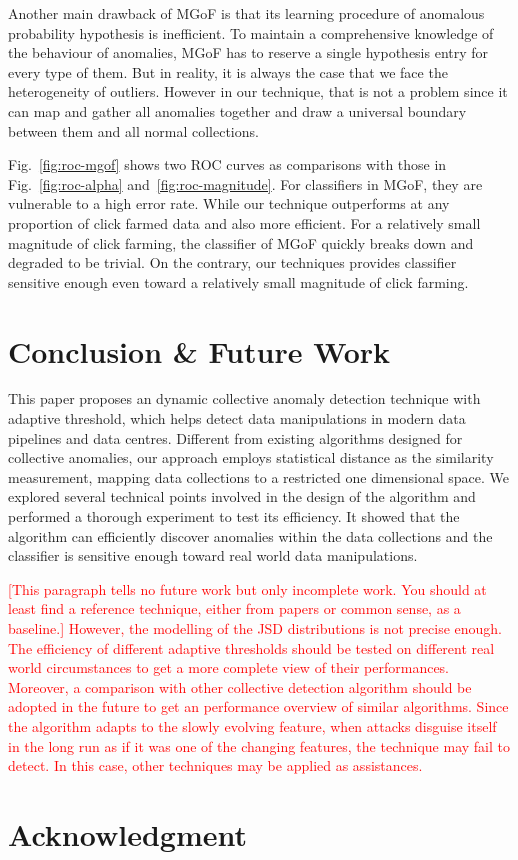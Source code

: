 \documentclass[10pt,conference,letterpaper]{IEEEtran}
\begin{document}
		Another main drawback of MGoF is that its learning procedure of anomalous probability hypothesis is inefficient. To maintain a comprehensive knowledge of the behaviour of anomalies, MGoF has to reserve a single hypothesis entry for every type of them. But in reality, it is always the case that we face the heterogeneity of outliers. However in our technique, that is not a problem since it can map and gather all anomalies together and draw a universal boundary between them and all normal collections.
	
		Fig.~\ref{fig:roc-mgof} shows two ROC curves as comparisons with those in Fig.~\ref{fig:roc-alpha} and~\ref{fig:roc-magnitude}. For classifiers in MGoF, they are vulnerable to a high error rate. While our technique outperforms at any proportion of click farmed data and also more efficient. For a relatively small magnitude of click farming, the classifier of MGoF quickly breaks down and degraded to be trivial. On the contrary, our techniques provides classifier sensitive enough even toward a relatively small magnitude of click farming.
			
	\section{Conclusion \& Future Work}\label{sec:conclusion}
		This paper proposes an dynamic collective anomaly detection technique with adaptive threshold, which helps detect data manipulations in modern data pipelines and data centres. Different from existing algorithms designed for collective anomalies, our approach employs statistical distance as the similarity measurement, mapping data collections to a restricted one dimensional space. We explored several technical points involved in the design of the algorithm and performed a thorough experiment to test its efficiency. It showed that the algorithm can efficiently discover anomalies within the data collections and the classifier is sensitive enough toward real world data manipulations.
		
		\textcolor{red}{[This paragraph tells no future work but only incomplete work. You should at least find a reference technique, either from papers or common sense, as a baseline.] However, the modelling of the JSD distributions is not precise enough. The efficiency of different adaptive thresholds should be tested on different real world circumstances to get a more complete view of their performances. Moreover, a comparison with other collective detection algorithm should be adopted in the future to get an performance overview of similar algorithms. Since the algorithm adapts to the slowly evolving feature, when attacks disguise itself in the long run as if it was one of the changing features, the technique may fail to detect. In this case, other techniques may be applied as assistances.}
		

\section*{Acknowledgment}





\end{document}
